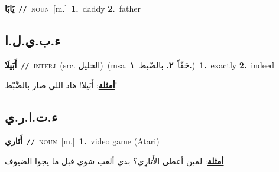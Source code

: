 \documentclass[10pt,a4paper,twoside]{article} %
\begin{document}
\begin{multicols}{2}
{\setlength\topsep{0pt}\textbf{\foreignlanguage{arabic}{يَابَا}}\ {\color{gray}\texttt{//}\color{black}}\ \textsc{noun}\ [m.]\ \textbf{1.}~daddy  \textbf{2.}~father\ } \vspace{2mm}

\vspace{-3mm}
\subsection*{\color{blue}\foreignlanguage{arabic}{ء.ب.ي.ل.ا}\color{blue}{ (ntws)}} 

{\setlength\topsep{0pt}\textbf{\foreignlanguage{arabic}{أَبَيلَا}}\ {\color{gray}\texttt{//}\color{black}}\ \textsc{interj}\ (src. \color{gray}\foreignlanguage{arabic}{الخليل}\color{black})\ \color{gray}(msa. \foreignlanguage{arabic}{حَقّاً}~\foreignlanguage{arabic}{\textbf{٢.}}  \foreignlanguage{arabic}{بالضّبط}~\foreignlanguage{arabic}{\textbf{١.}})\color{black}\ \textbf{1.}~exactly  \textbf{2.}~indeed\  \begin{flushright}\color{gray}\foreignlanguage{arabic}{\textbf{\underline{\foreignlanguage{arabic}{أمثلة}}}: أَبَيلا! هاد اللي صار بالضَّبْط!}\end{flushright}\color{black}} \vspace{2mm}

\vspace{-3mm}
\subsection*{\color{blue}\foreignlanguage{arabic}{ء.ت.ا.ر.ي}\color{blue}{ (ntws)}} 

{\setlength\topsep{0pt}\textbf{\foreignlanguage{arabic}{أَتَاري}}\ {\color{gray}\texttt{//}\color{black}}\ \textsc{noun}\ [m.]\ \textbf{1.}~video game (Atari)\  \begin{flushright}\color{gray}\foreignlanguage{arabic}{\textbf{\underline{\foreignlanguage{arabic}{أمثلة}}}: لمين أعطى الأَتارِي؟ بدي ألعب شوي قبل ما يجوا الضيوف}\end{flushright}\color{black}} \vspace{2mm}


\end{multicols}
\end{document}
